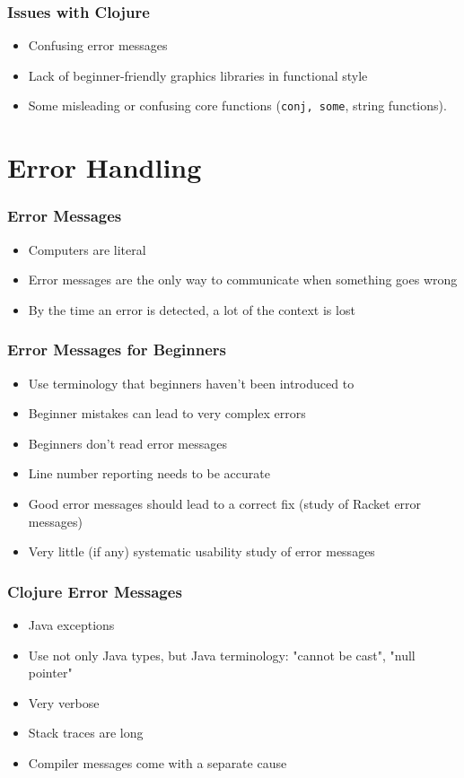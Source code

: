 \documentclass{beamer}
\begin{document}
\begin{frame}
	\frametitle{Issues with Clojure}
	\begin{itemize}
		\item Confusing error messages
		\item Lack of beginner-friendly graphics libraries in functional style
		\item Some misleading or confusing core functions ({\tt conj, some}, string functions).   
	\end{itemize}
\end{frame}

\section{Error Handling}

\begin{frame}
	\frametitle{Error Messages}
	\begin{itemize}
		\item Computers are literal
		\item Error messages are the only way to communicate when something goes wrong
		\item By the time an error is detected, a lot of the context is lost
	\end{itemize}
\end{frame}

\begin{frame}
	\frametitle{Error Messages for Beginners}
	\begin{itemize}
		\item Use terminology that beginners haven't been introduced to
		\item Beginner mistakes can lead to very complex errors
		\item Beginners don't read error messages
		\item Line number reporting needs to be accurate
		\item Good error messages should lead to a correct fix (study of Racket error messages)
		\item Very little (if any) systematic usability study of error messages
	\end{itemize}
\end{frame}

\begin{frame}
	\frametitle{Clojure Error Messages}
	\begin{itemize}
		\item Java exceptions
		\item Use not only Java types, but Java terminology: "cannot be cast", "null pointer"
		\item Very verbose
		\item Stack traces are long
		\item Compiler messages come with a separate cause
	\end{itemize}
\end{frame}
\end{document}
